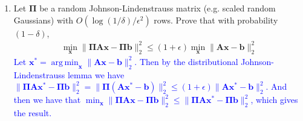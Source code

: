 \documentclass[10pt]{article}
\newcommand{\bs}[1]{\boldsymbol{#1}}
\newcommand{\bv}[1]{\mathbf{#1}}
\DeclareMathOperator*{\argmin}{arg\,min}
\begin{document}
\begin{enumerate}
\begin{enumerate}
		
	\end{enumerate}
	\item Let $\bs{\Pi}$ be a random Johnson-Lindenstrauss matrix (e.g. scaled random Gaussians) with $O(\log(1/\delta)/\epsilon^2)$ rows. Prove that with probability $(1-\delta)$,
	\begin{align*}
	\min_{\bv{x}} \|\bs{\Pi}\bv{A}\bv{x} - \bs{\Pi}\bv{b}\|_2^2 \leq (1+\epsilon) \min_{\bv{x}} \|\bv{A}\bv{x} - \bv{b}\|_2^2 
	\end{align*}
\textcolor{blue}{Let $\bv{x}^* = \argmin_{\bv{x}} \|\bv{A}\bv{x} - \bv{b}\|_2^2.$ Then by the distributional Johnson-Lindenstrauss lemma we have $\|\bs{\Pi}\bv{A}\bv{x}^* - \bs{\Pi}\bv{b}\|_2^2 = \|\bs{\Pi}(\bv{A}\bv{x}^* - \bv{b})\|_2^2 \leq (1+\epsilon)\|\bv{A}\bv{x}^* - \bv{b}\|_2^2$. And then we have that $\min_{\bv{x}} \|\bs{\Pi}\bv{A}\bv{x} - \bs{\Pi}\bv{b}\|_2^2 \leq \|\bs{\Pi}\bv{A}\bv{x}^* - \bs{\Pi}\bv{b}\|_2^2$, which gives the result.}


\end{enumerate}



\end{document}
